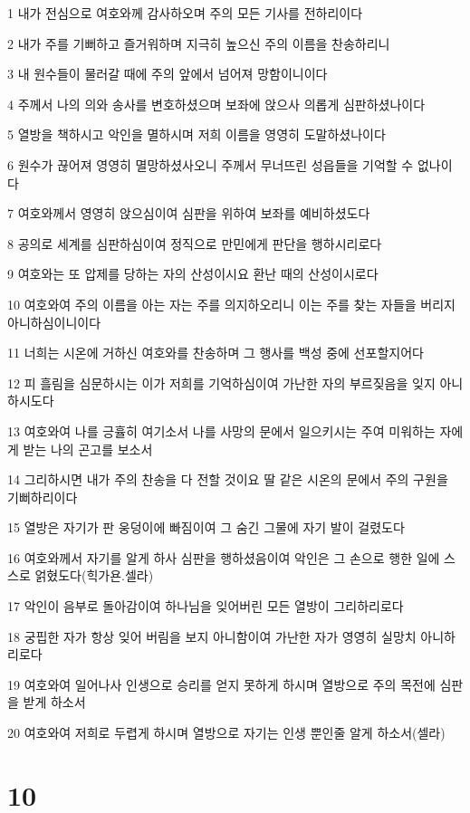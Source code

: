 \par 1 내가 전심으로 여호와께 감사하오며 주의 모든 기사를 전하리이다
\par 2 내가 주를 기뻐하고 즐거워하며 지극히 높으신 주의 이름을 찬송하리니
\par 3 내 원수들이 물러갈 때에 주의 앞에서 넘어져 망함이니이다
\par 4 주께서 나의 의와 송사를 변호하셨으며 보좌에 앉으사 의롭게 심판하셨나이다
\par 5 열방을 책하시고 악인을 멸하시며 저희 이름을 영영히 도말하셨나이다
\par 6 원수가 끊어져 영영히 멸망하셨사오니 주께서 무너뜨린 성읍들을 기억할 수 없나이다
\par 7 여호와께서 영영히 앉으심이여 심판을 위하여 보좌를 예비하셨도다
\par 8 공의로 세계를 심판하심이여 정직으로 만민에게 판단을 행하시리로다
\par 9 여호와는 또 압제를 당하는 자의 산성이시요 환난 때의 산성이시로다
\par 10 여호와여 주의 이름을 아는 자는 주를 의지하오리니 이는 주를 찾는 자들을 버리지 아니하심이니이다
\par 11 너희는 시온에 거하신 여호와를 찬송하며 그 행사를 백성 중에 선포할지어다
\par 12 피 흘림을 심문하시는 이가 저희를 기억하심이여 가난한 자의 부르짖음을 잊지 아니하시도다
\par 13 여호와여 나를 긍휼히 여기소서 나를 사망의 문에서 일으키시는 주여 미워하는 자에게 받는 나의 곤고를 보소서
\par 14 그리하시면 내가 주의 찬송을 다 전할 것이요 딸 같은 시온의 문에서 주의 구원을 기뻐하리이다
\par 15 열방은 자기가 판 웅덩이에 빠짐이여 그 숨긴 그물에 자기 발이 걸렸도다
\par 16 여호와께서 자기를 알게 하사 심판을 행하셨음이여 악인은 그 손으로 행한 일에 스스로 얽혔도다(힉가욘.셀라)
\par 17 악인이 음부로 돌아감이여 하나님을 잊어버린 모든 열방이 그리하리로다
\par 18 궁핍한 자가 항상 잊어 버림을 보지 아니함이여 가난한 자가 영영히 실망치 아니하리로다
\par 19 여호와여 일어나사 인생으로 승리를 얻지 못하게 하시며 열방으로 주의 목전에 심판을 받게 하소서
\par 20 여호와여 저희로 두렵게 하시며 열방으로 자기는 인생 뿐인줄 알게 하소서(셀라)

\chapter{10}

